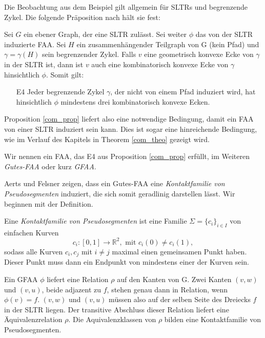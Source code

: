 Die Beobachtung aus dem Beispiel gilt allgemein für SLTRs und begrenzende Zykel. Die folgende Präposition nach \cite[Prop 2.2, Prop 2.4]{af13} hält sie fest:

\begin{proposition}\label{com_prop}
Sei $G$ ein ebener Graph, der eine SLTR zulässt. Sei weiter $\phi$ das von der SLTR induzierte FAA. Sei $H$ ein zusammenhängender Teilgraph von G (kein Pfad) und $\gamma = \gamma(H)$ sein begrenzender Zykel. Falls $v$ eine geometrisch konvexe Ecke von $\gamma$ in der SLTR ist, dann ist $v$ auch eine kombinatorisch konvexe Ecke von $\gamma$ hinsichtlich $\phi$. Somit gilt:
\begin{itemize}
\item [E4] Jeder begrenzende Zykel $\gamma$, der nicht von einem Pfad induziert wird, hat hinsichtlich $\phi$ mindestens drei kombinatorisch konvexe Ecken.
\end{itemize}
\end{proposition}

Proposition \ref{com_prop} liefert also eine notwendige Bedingung, damit ein FAA von einer SLTR induziert sein kann. Dies ist sogar eine hinreichende Bedingung, wie im Verlauf des Kapitels in Theorem \ref{com_theo} gezeigt wird. 

\begin{definition}
Wir nennen ein FAA, das E4 aus Proposition \ref{com_prop} erfüllt, im Weiteren \textit{Gutes-FAA} oder kurz \textit{GFAA}.
\end{definition}

Aerts und Felsner zeigen, dass ein Gutes-FAA eine \textit{Kontaktfamilie von Pseudosegmenten} induziert, die sich somit geradlinig darstellen lässt. Wir beginnen mit der Definition.

\begin{definition}
Eine \textit{Kontaktfamilie von Pseudosegmenten} ist eine Familie $\Sigma = \{c_i\}_{i\in I}$ von einfachen Kurven $$c_i:[0,1] \to \mathbb{R}^2, \text{ mit } c_i(0) \neq c_i(1),$$ sodass alle Kurven $c_i,c_j$ mit $i \neq j$ maximal einen gemeinsamen Punkt haben. Dieser Punkt muss dann ein Endpunkt von mindestens einer der Kurven sein.
\end{definition}

Ein GFAA $\phi$ liefert eine Relation $\rho$ auf den Kanten von G. Zwei Kanten $(v,w)$ und $(v,u)$, beide adjazent zu $f$, stehen genau dann in Relation, wenn $\phi(v)=f$. $(v,w)$ und $(v,u)$ müssen also auf der selben Seite  des Dreiecks $f$ in der SLTR liegen. Der transitive Abschluss dieser Relation liefert eine Äquivalenzrelation $\rho$. Die Aquivalenzklassen von $\rho$ bilden eine Kontaktfamilie von Pseudosegmenten.

